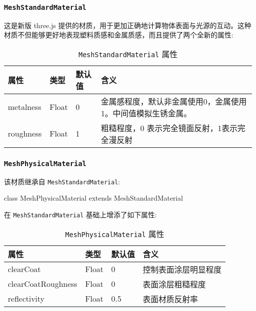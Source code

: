 \subsubsection*{\texttt{MeshStandardMaterial}}

这是新版 three.js 提供的材质，用于更加正确地计算物体表面与光源的互动。这种材质不但能够更好地表现塑料质感和金属质感，而且提供了两个全新的属性:

\begin{table}[H]
  \centering
  \small
  \caption{\texttt{MeshStandardMaterial} 属性}
  \setlength{\tabcolsep}{4mm}
  \begin{tabular}{l|l|l|l}
    \toprule
    \textbf{属性} & \textbf{类型} & \textbf{默认值} & \textbf{含义} \\
    \midrule
    metalness & Float & 0 & 金属感程度，默认非金属使用0，金属使用1。中间值模拟生锈金属。 \\
    roughness & Float & 1 & 粗糙程度，0 表示完全镜面反射，1表示完全漫反射 \\
    \bottomrule
  \end{tabular}
\end{table}

\subsubsection*{\texttt{MeshPhysicalMaterial}}

该材质继承自 \texttt{MeshStandardMaterial}:

\begin{JavaScript}
class MeshPhysicalMaterial extends MeshStandardMaterial
\end{JavaScript}

在 \texttt{MeshStandardMaterial} 基础上增添了如下属性:

\begin{table}[H]
  \centering
  \small
  \caption{\texttt{MeshPhysicalMaterial} 属性}
  \setlength{\tabcolsep}{4mm}
  \begin{tabular}{l|l|l|l}
    \toprule
    \textbf{属性} & \textbf{类型} & \textbf{默认值} & \textbf{含义} \\
    \midrule
    clearCoat & Float & 0 & 控制表面涂层明显程度 \\
    clearCoatRoughness & Float & 0 & 表面涂层粗糙程度 \\
    reflectivity & Float & 0.5 & 表面材质反射率 \\
    \bottomrule
  \end{tabular}
\end{table}

